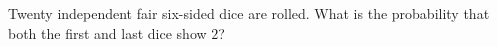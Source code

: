 Twenty independent fair six-sided dice are rolled. What is the probability that both the first and last dice show $ 2 $?

